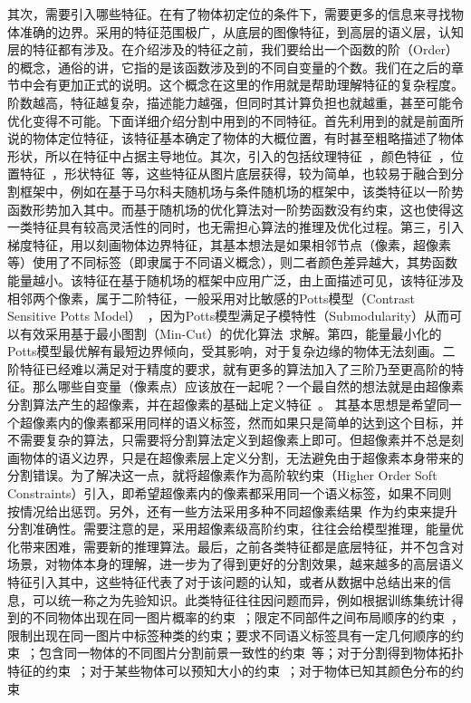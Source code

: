 其次，需要引入哪些特征。在有了物体初定位的条件下，需要更多的信息来寻找物体准确的边界。采用的特征范围极广，从底层的图像特征，到高层的语义层，认知层的特征都有涉及。在介绍涉及的特征之前，我们要给出一个函数的阶（Order）的概念，通俗的讲，它指的是该函数涉及到的不同自变量的个数。我们在之后的章节中会有更加正式的说明。这个概念在这里的作用就是帮助理解特征的复杂程度。阶数越高，特征越复杂，描述能力越强，但同时其计算负担也就越重，甚至可能令优化变得不可能。下面详细介绍分割中用到的不同特征。首先利用到的就是前面所说的物体定位特征，该特征基本确定了物体的大概位置，有时甚至粗略描述了物体形状，所以在特征中占据主导地位。其次，引入的包括纹理特征~\cite{objcut}，颜色特征~\cite{textonboost}\cite{whoblockswho}\cite{goodparts}\cite{layeredobject}，位置特征~\cite{textonboost}\cite{whoblockswho}\cite{goodparts}，形状特征~\cite{layeredobject}\cite{whoblockswho}\cite{goodparts}等，这些特征从图片底层获得，较为简单，也较易于融合到分割框架中，例如在基于马尔科夫随机场与条件随机场的框架中，该类特征以一阶势函数形势加入其中。而基于随机场的优化算法对一阶势函数没有约束，这也使得这一类特征具有较高灵活性的同时，也无需担心算法的推理及优化过程。第三，引入梯度特征，用以刻画物体边界特征，其基本想法是如果相邻节点（像素，超像素等）使用了不同标签（即隶属于不同语义概念），则二者颜色差异越大，其势函数能量越小。该特征在基于随机场的框架中应用广泛，由上面描述可见，该特征涉及相邻两个像素，属于二阶特征，一般采用对比敏感的Potts模型（Contrast Sensitive Potts Model）~\cite{pottsmodel}，因为Potts模型满足子模特性（Submodularity）从而可以有效采用基于最小图割（Min-Cut）的优化算法~\cite{fastgc}\cite{expmincut}\cite{whatenergy}求解。第四，能量最小化的Potts模型最优解有最短边界倾向，受其影响，对于复杂边缘的物体无法刻画。二阶特征已经难以满足对于精度的要求，就有更多的算法加入了三阶乃至更高阶的特征。那么哪些自变量（像素点）应该放在一起呢？一个最自然的想法就是由超像素分割算法产生的超像素，并在超像素的基础上定义特征~\cite{robusthighorder}\cite{hierarchicalcrf}\cite{stackedlabel}\cite{harmonypot}。 其基本思想是希望同一个超像素内的像素都采用同样的语义标签，然而如果只是简单的达到这个目标，并不需要复杂的算法，只需要将分割算法定义到超像素上即可\cite{layeredobject}\cite{classaffinity}。但超像素并不总是刻画物体的语义边界，只是在超像素层上定义分割，无法避免由于超像素本身带来的分割错误。为了解决这一点，就将超像素作为高阶软约束（Higher Order Soft Constraints）引入，即希望超像素内的像素都采用同一个语义标签，如果不同则按情况给出惩罚。另外，还有一些方法采用多种不同超像素结果~\cite{hierarchicalcrf}\cite{stackedlabel}作为约束来提升分割准确性。需要注意的是，采用超像素级高阶约束，往往会给模型推理，能量优化带来困难，需要新的推理算法。最后，之前各类特征都是底层特征，并不包含对场景，对物体本身的理解，进一步为了得到更好的分割效果，越来越多的高层语义特征引入其中，这些特征代表了对于该问题的认知，或者从数据中总结出来的信息，可以统一称之为先验知识。此类特征往往因问题而异，例如根据训练集统计得到的不同物体出现在同一图片概率的约束~\cite{cooccur}；限定不同部件之间布局顺序的约束~\cite{layoutcrf}，限制出现在同一图片中标签种类的约束\cite{labelcost}；要求不同语义标签具有一定几何顺序的约束~\cite{labelorder}；包含同一物体的不同图片分割前景一致性的约束~\cite{multicoseg}\cite{objcoseg}等；对于分割得到物体拓扑特征的约束~\cite{topocut}；对于某些物体可以预知大小的约束~\cite{labelcount}；对于物体已知其颜色分布的约束\cite{distcut} 
